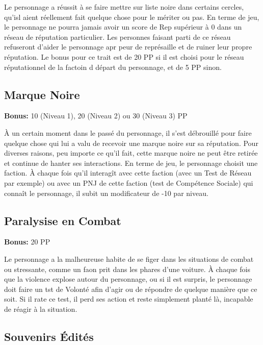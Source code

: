Le personnage a réussit à se faire mettre sur liste noire dans certains cercles, qu'isl aient réellement fait quelque chose pour le mériter ou pas. En terme de jeu, le personnage ne pourra jamais avoir un score de Rep supérieur à 0 dans un réseau de réputation particulier. Les personnes faisant parti de ce réseau refuseront d'aider le personnage apr peur de représaille et de ruiner leur propre réputation. Le bonus pour ce trait est de 20 PP si il est choisi pour le réseau réputationnel de la factoin d départ du personnage, et de 5 PP sinon. 

\subsection{Marque Noire} \label{sec:traits-black-mark} 

\textbf{Bonus:} 10 (Niveau 1), 20 (Niveau 2) ou 30 (Niveau 3) PP 

À un certain moment dans le passé du personnage, il s'est débrouillé pour faire quelque chose qui lui a valu de recevoir une marque noire sur sa réputation. Pour diverses raisons, peu importe ce qu'il fait, cette marque noire ne peut être retirée et continue de hanter ses interactions. En terme de jeu, le personnage choisit une faction. À chaque fois qu'il interagît avec cette faction (avec un Test de Réseau par exemple) ou avec un PNJ de cette faction (test de Compétence Sociale) qui connaît le personnage, il subit un modificateur de -10 par niveau. 

\subsection{Paralysise en Combat} \label{sec:traits-combat-paralysis} 

\textbf{Bonus:} 20 PP 

Le personnage a la malheureuse habite de se figer dans les situations de combat ou stressante, comme un faon prit dans les phares d'une voiture. À chaque fois que la violence explose autour du personnage, ou si il est surpris, le personnage doit faire un tst de Volonté afin d'agir ou de répondre de quelque manière que ce soit. Si il rate ce test, il perd ses action et reste simplement planté là, incapable de réagir à la situation. 

\subsection{Souvenirs Édités} \label{sec:traits-edited-memories} 

